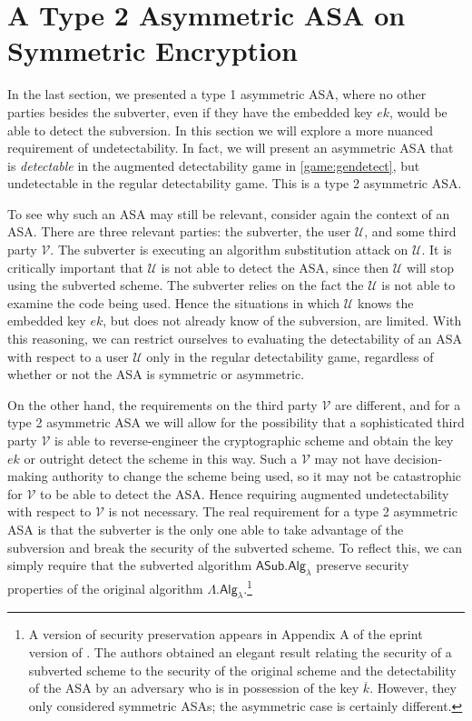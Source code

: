 \chapter{A Type 2 Asymmetric ASA on Symmetric Encryption} \label{sec:asymASA2}

In the last section, we presented a type 1 asymmetric ASA, where no other parties besides the subverter, even if they have the embedded key $ek$, would be able to detect the subversion. In this section we will explore a more nuanced requirement of undetectability. In fact, we will present an asymmetric ASA that is \emph{detectable} in the augmented detectability game in \autoref{game:gendetect}, but undetectable in the regular detectability game. This is a type 2 asymmetric ASA.

To see why such an ASA may still be relevant, consider again the context of an ASA. There are three relevant parties: the subverter, the user $\mathcal{U}$, and some third party $\mathcal{V}$. The subverter is executing an algorithm substitution attack on $\mathcal{U}$. It is critically important that $\mathcal{U}$ is not able to detect the ASA, since then $\mathcal{U}$ will stop using the subverted scheme. The subverter relies on the fact the $\mathcal{U}$ is not able to examine the code being used. Hence the situations in which $\mathcal{U}$ knows the embedded key $ek$, but does not already know of the subversion, are limited. With this reasoning, we can restrict ourselves to evaluating the detectability of an ASA with respect to a user $\mathcal{U}$ only in the regular detectability game, regardless of whether or not the ASA is symmetric or asymmetric.

On the other hand, the requirements on the third party $\mathcal{V}$ are different, and for a type 2 asymmetric ASA we will allow for the possibility that a sophisticated third party $\mathcal{V}$ is able to reverse-engineer the cryptographic scheme and obtain the key $ek$ or outright detect the scheme in this way. Such a $\mathcal{V}$ may not have decision-making authority to change the scheme being used, so it may not be catastrophic for $\mathcal{V}$ to be able to detect the ASA. Hence requiring augmented undetectability with respect to $\mathcal{V}$ is not necessary. The real requirement for a type 2 asymmetric ASA is that the subverter is the only one able to take advantage of the subversion and break the security of the subverted scheme. To reflect this, we can simply require that the subverted algorithm $\mathsf{ASub.Alg_\lambda}$ preserve security properties of the original algorithm $\mathsf{\Lambda.Alg_\lambda}$.\footnote{A version of security preservation appears in Appendix A of the eprint version of \cite{FSE:DegFarPoe15}. The authors obtained an elegant result relating the security of a subverted scheme to the security of the original scheme and the detectability of the ASA by an adversary who is in possession of the key $\overline{k}$. However, they only considered symmetric ASAs; the asymmetric case is certainly different.}

